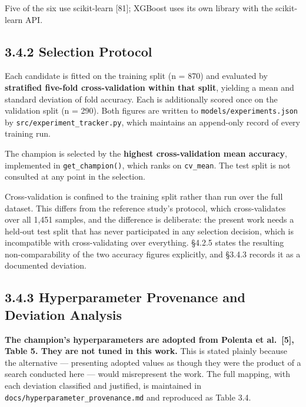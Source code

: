Five of the six use scikit-learn {[}81{]}; XGBoost uses its own library with the scikit-learn API.

\hypertarget{selection-protocol}{%
\subsection{3.4.2 Selection Protocol}\label{selection-protocol}}

Each candidate is fitted on the training split (n = 870) and evaluated by \textbf{stratified five-fold cross-validation within that split}, yielding a mean and standard deviation of fold accuracy. Each is additionally scored once on the validation split (n = 290). Both figures are written to \texttt{models/experiments.json} by \texttt{src/experiment\_tracker.py}, which maintains an append-only record of every training run.

The champion is selected by the \textbf{highest cross-validation mean accuracy}, implemented in \texttt{get\_champion()}, which ranks on \texttt{cv\_mean}. The test split is not consulted at any point in the selection.

Cross-validation is confined to the training split rather than run over the full dataset. This differs from the reference study's protocol, which cross-validates over all 1,451 samples, and the difference is deliberate: the present work needs a held-out test split that has never participated in any selection decision, which is incompatible with cross-validating over everything. §4.2.5 states the resulting non-comparability of the two accuracy figures explicitly, and §3.4.3 records it as a documented deviation.

\hypertarget{hyperparameter-provenance-and-deviation-analysis}{%
\subsection{3.4.3 Hyperparameter Provenance and Deviation Analysis}\label{hyperparameter-provenance-and-deviation-analysis}}

\textbf{The champion's hyperparameters are adopted from Polenta et al.~{[}5{]}, Table 5. They are not tuned in this work.} This is stated plainly because the alternative --- presenting adopted values as though they were the product of a search conducted here --- would misrepresent the work. The full mapping, with each deviation classified and justified, is maintained in \texttt{docs/hyperparameter\_provenance.md} and reproduced as Table 3.4.

